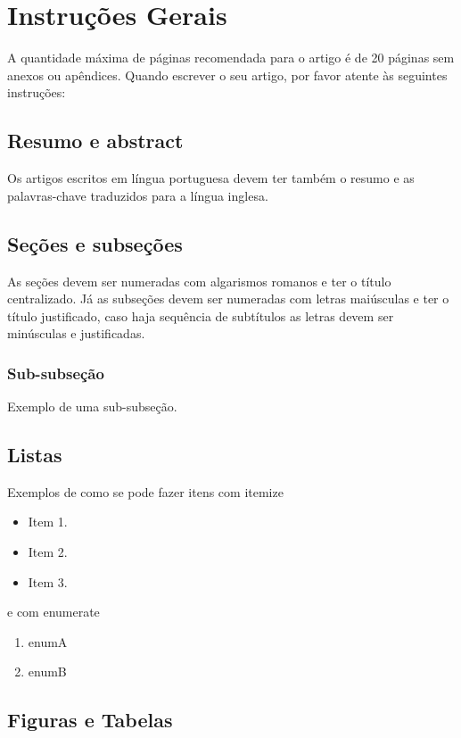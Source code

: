 \section{Instruções Gerais}

A quantidade máxima de páginas recomendada para o artigo é de 20 páginas sem anexos ou apêndices.
Quando escrever o seu artigo, por favor atente às seguintes instruções:

\subsection{Resumo e abstract}
Os artigos escritos em língua portuguesa devem ter também o resumo e as palavras-chave traduzidos para a língua inglesa.

\subsection{Seções e subseções}
As seções devem ser numeradas com algarismos romanos e ter o título centralizado. Já as subseções devem ser numeradas com letras maiúsculas e ter o título justificado, caso haja sequência de subtítulos as letras devem ser minúsculas e justificadas. 

\subsubsection{Sub-subseção}

Exemplo de uma sub-subseção.

\subsection{Listas}

Exemplos de como se pode fazer itens com itemize

\begin{itemize}
\item Item 1.
\item Item 2.
\item Item 3.
\end{itemize}

e com enumerate

\begin{enumerate}
 \item enumA
 \item enumB
\end{enumerate}

\subsection{Figuras e Tabelas}

